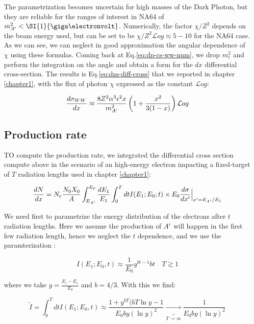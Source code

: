  The parametrization becomes uncertain for high masses of the Dark Photon, but they are reliable for the ranges of interest in NA64 of $m^2_{\DM} < \SI{1}{\giga\electronvolt}$. Numerically, the factor $\chi / Z^2$ depends on the beam energy used, but can be set to be $\chi/Z^2 \mathcal{L}og \approx 5-10$ for the NA64 case. As we can see, we can neglect in good approximation the angular dependence of $\chi$ using these formulas. Coming back at Eq.\ref{eq:dp-cs-ww-num}, we drop $m^2_e$ and perform the integration on the angle and obtain a form for the $dx$ differential cross-section. The results is Eq.\ref{eq:dm-diff-cross} that we reported in chapter \ref{chapter1}, with the flux of photon $\chi$ expressed as the constant $\mathcal{L}og$:

 \begin{equation}
   \label{eq:dp-cs-dx}
\frac{d\sigma_{WW}}{dx} \approx \frac{8 Z^2 \alpha^3 \epsilon^2 x}{m^2_{A'}} \left( 1 + \frac{x^2}{3(1-x)} \right) \mathcal{L}og    
\end{equation}


\subsection{Production rate}

TO compute the production rate, we integrated the differential cross section compute above in the scenario of an high-energy electron impacting a fixed-target of $T$ radiation lengths used in chapter \ref{chapter1}:


\begin{equation}
  \label{eq:dm-gy}
  \frac{dN}{dx} = N_e \frac{N_0 X_0}{A} \int_{E_{A'}}^{E_0} \frac{dE_1}{E_1} \int_0^T dt I(E_1;E_0;t) \times E_0 \frac{d\sigma}{dx'}\Big|_{x' = E_{A'}/E_1}
\end{equation}

We need first to parametrize the energy distribution of the electrons after $t$ radiation lengths. Here we assume the production of $A'$ will happen in the first few radiation length, hence we neglect the $t$ dependence, and we use the paramterization \cite{jdb}:

\begin{equation}
  \label{eq:i-dist}
  I(E_1;E_0,t) \approx  \frac{1}{E_0} y^{bt-1} bt \quad T \gtrsim 1
\end{equation}

where we take $y = \frac{E_) - E_1}{E_0}$ and $b=4/3$. With this we find:

\begin{equation}
  \label{eq:i-int}
  \widetilde{I} = \int^T_0 dt I(E_1; E_0, t) \approx \frac{1 + y^{bT}(bT\ln{y} - 1}{E_0by(\ln{y})^2} \underbrace{\to}_{T \to \infty} \frac{1}{E_0by(\ln{y})^2}
\end{equation}

